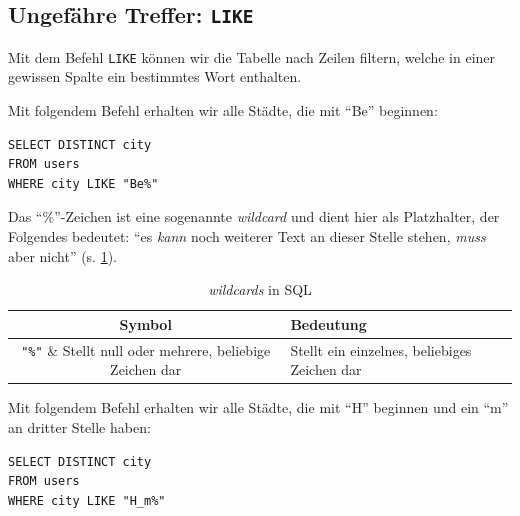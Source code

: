 \subsection{Ungefähre Treffer: \texorpdfstring{\lstinline|LIKE|}{LIKE}}

Mit dem Befehl \lstinline|LIKE| können wir die Tabelle nach Zeilen filtern, welche in einer gewissen Spalte ein bestimmtes Wort enthalten.

\begin{myexample}
Mit folgendem Befehl erhalten wir alle Städte, die mit ``Be'' beginnen:

\begin{lstlisting}
SELECT DISTINCT city 
FROM users 
WHERE city LIKE "Be%"
\end{lstlisting}
\end{myexample}

Das ``\%''-Zeichen ist eine sogenannte \textit{wildcard} und dient hier als Platzhalter, der Folgendes bedeutet: ``es \textit{kann} noch weiterer Text an dieser Stelle stehen, \textit{muss} aber nicht'' (s. \cref{table:wildcards}).

\begin{table}[ht]
  \centering
  \begin{tabular}{c|l}
    \textbf{Symbol}            & \textbf{Bedeutung}                              \\ \midrule
    \lstinline|"%"| & Stellt null oder mehrere, beliebige Zeichen dar \\ \hline
    \lstinline|"_"| & Stellt ein einzelnes, beliebiges Zeichen dar    \\
  \end{tabular}
  \caption{\textit{wildcards} in \gls{SQL}}
  \label{table:wildcards}
\end{table}

\begin{myexample}
Mit folgendem Befehl erhalten wir alle Städte, die mit ``H'' beginnen und ein ``m'' an dritter Stelle haben:

\begin{lstlisting}
SELECT DISTINCT city 
FROM users 
WHERE city LIKE "H_m%"
\end{lstlisting}
\end{myexample}



